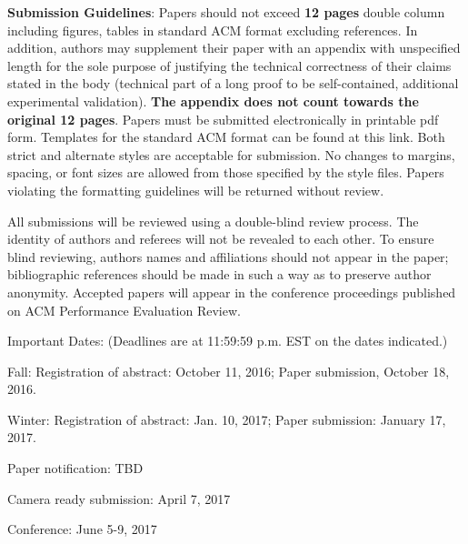 \textbf{Submission Guidelines}: Papers should not exceed \textbf{12 pages} double column including figures, tables in standard ACM format excluding references. In addition, authors may supplement their paper with an appendix with unspecified length for the sole purpose of justifying the technical correctness of their claims stated in the body (technical part of a long proof to be self-contained, additional experimental validation). \textbf{The appendix does not count towards the original 12 pages}. Papers must be submitted electronically in printable pdf form. Templates for the standard ACM format can be found at this link. Both strict and alternate styles are acceptable for submission. No changes to margins, spacing, or font sizes are allowed from those specified by the style files. Papers violating the formatting guidelines will be returned without review.

All submissions will be reviewed using a double-blind review process. The identity of authors and referees will not be revealed to each other. To ensure blind reviewing, authors names and affiliations should not appear in the paper; bibliographic references should be made in such a way as to preserve author anonymity. Accepted papers will appear in the conference proceedings published on ACM Performance Evaluation Review.

Important Dates: (Deadlines are at 11:59:59 p.m. EST on the dates indicated.)

Fall: Registration of abstract: October 11, 2016; Paper submission, October 18, 2016.

Winter: Registration of abstract: Jan. 10, 2017; Paper submission: January 17, 2017.

Paper notification: TBD

Camera ready submission: April 7, 2017

Conference: June 5-9, 2017
